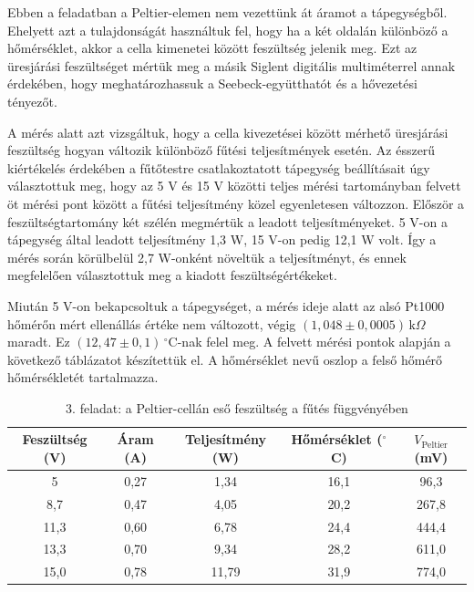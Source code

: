 \documentclass[11pt]{article}
\begin{document}
Ebben a feladatban a Peltier-elemen nem vezettünk át áramot a tápegységből. Ehelyett azt a tulajdonságát használtuk fel, hogy ha a két oldalán különböző a hőmérséklet, akkor a cella kimenetei között feszültség jelenik meg. Ezt az üresjárási feszültséget mértük meg a másik Siglent digitális multiméterrel annak érdekében, hogy meghatározhassuk a Seebeck-együtthatót és a hővezetési tényezőt.

A mérés alatt azt vizsgáltuk, hogy a cella kivezetései között mérhető üresjárási feszültség hogyan változik különböző fűtési teljesítmények esetén. Az ésszerű kiértékelés érdekében a fűtőtestre csatlakoztatott tápegység beállításait úgy választottuk meg, hogy az 5 V és 15 V közötti teljes mérési tartományban felvett öt mérési pont között a fűtési teljesítmény közel egyenletesen változzon. Először a feszültségtartomány két szélén megmértük a leadott teljesítményeket. 5 V-on a tápegység által leadott teljesítmény 1,3 W, 15 V-on pedig 12,1 W volt. Így a mérés során körülbelül 2,7 W-onként növeltük a teljesítményt, és ennek megfelelően választottuk meg a kiadott feszültségértékeket.

Miután 5 V-on bekapcsoltuk a tápegységet, a mérés ideje alatt az alsó Pt1000 hőmérőn mért ellenállás értéke nem változott, végig $(1,048 \pm 0,0005) \,\mathrm{k}\Omega$ maradt. Ez $(12,47 \pm 0,1) \,^\circ\mathrm{C}$-nak felel meg. A felvett mérési pontok alapján a következő táblázatot készítettük el. A hőmérséklet nevű oszlop a felső hőmérő hőmérsékletét tartalmazza.

\begin{table}[h]
    \centering
    \begin{tabular}{|c|c|c|c|c|}
        \hline
        Feszültség (V) & Áram (A) & Teljesítmény (W) & Hőmérséklet ($^\circ$C) & $V_{\mathrm{Peltier}}$ (mV) \\
        \hline
        5 & 0,27 & 1,34 & 16,1 & 96,3 \\
        \hline
        8,7 & 0,47 & 4,05 & 20,2 & 267,8 \\
        \hline
        11,3 & 0,60 & 6,78 & 24,4 & 444,4 \\
        \hline
        13,3 & 0,70 & 9,34 & 28,2 & 611,0 \\
        \hline
        15,0 & 0,78 & 11,79 & 31,9 & 774,0 \\
        \hline
    \end{tabular}
    \caption{3. feladat: a Peltier-cellán eső feszültség a fűtés függvényében}
    \label{tab:meresi-adatok}
\end{table}
\end{document}
